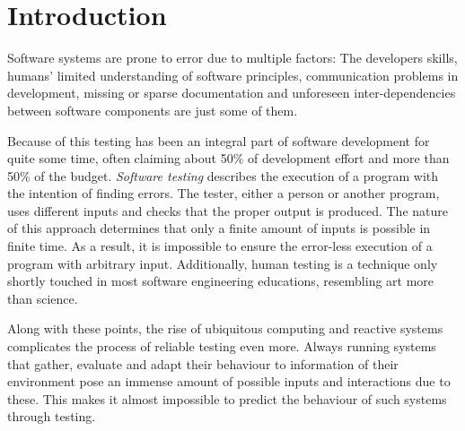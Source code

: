 \chapter{Introduction}
Software systems are prone to error due to multiple factors: The developers skills, humans' limited understanding of software principles, communication problems in development, missing or sparse documentation and unforeseen inter-dependencies between software components are just some of them.

Because of this testing has been an integral part of software development for quite some time, often claiming about 50\% of development effort and more than 50\% of the budget.
\emph{Software testing} describes the execution of a program with the intention of finding errors.
The tester, either a person or another program, uses different inputs and checks that the proper output is produced.
The nature of this approach determines that only a finite amount of inputs is possible in finite time.
As a result, it is impossible to ensure the error-less execution of a program with arbitrary input.
Additionally, human testing is a technique only shortly touched in most software engineering educations, resembling art more than science.\cite{Myers2011}

Along with these points, the rise of ubiquitous computing and reactive systems complicates the process of reliable testing even more.
Always running systems that gather, evaluate and adapt their behaviour to information of their environment pose an immense amount of possible inputs and interactions due to these.
This makes it almost impossible to predict the behaviour of such systems through testing.

